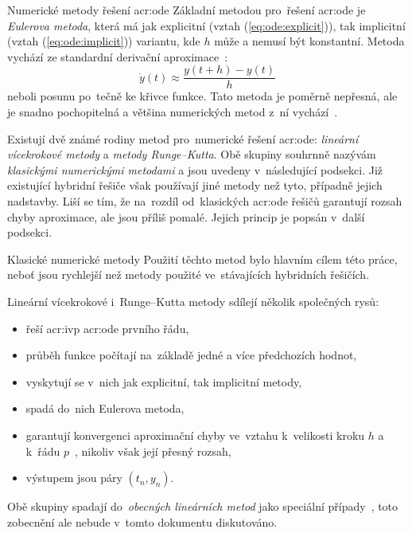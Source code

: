 \documentclass[thesis=M,czech]{FITthesis}[2012/06/26]
\newcommand{\acrlabel}[1]{acr:#1}
\newcommand{\acr}[1]{\acrshort{\acrlabel{#1}}}
\newcommand{\hl}[1]{\textit{#1}}
\newcommand{\name}[1]{\hl{#1}}
\newcommand{\cit}[1]{\cite{#1}}
\newcommand{\rf}[1]{\ref{#1}}
\newcommand{\rfeq}[1]{(\rf{eq:#1})}
\newcommand{\der}[1]{\ensuremath{\dot{#1}}}
\begin{document}
\begin{section}{Numerické metody řešení \acr{ode}}
Základní metodou pro~řešení \acr{ode}
je \name{Eulerova metoda},
která má jak explicitní
(vztah \rfeq{ode:explicit}),
tak implicitní
(vztah \rfeq{ode:implicit})
variantu,
kde $h$ může a nemusí být konstantní.
Metoda vychází ze standardní derivační aproximace~\cit{ode-nsolve-book}:
\begin{equation}\label{eq:der:apx}
   \der{y}(t) \approx \frac{y(t+h) - y(t)}{h}
\end{equation}
neboli posunu po~tečně ke křivce funkce.
Tato metoda je poměrně nepřesná,
ale je snadno pochopitelná
a většina numerických metod z~ní vychází~\cit{ode-nsolve-intro}.

Existují dvě známé rodiny metod pro~numerické řešení \acr{ode}:
\name{lineární vícekrokové metody}
a \name{metody Runge--Kutta}.
Obě skupiny souhrnně nazývám
\name{klasickými numerickými metodami}
a jsou uvedeny v~následující podsekci.
Již existující hybridní řešiče
však používají jiné metody než tyto,
případně jejich nadstavby.
Liší se tím,
že na~rozdíl od~klasických \acr{ode} řešičů
garantují rozsah chyby aproximace, ale jsou příliš pomalé.
Jejich princip je popsán v~další podsekci.


\begin{subsection}{Klasické numerické metody}\label{ss:search:ode:classic}
Použití těchto metod bylo hlavním cílem této práce,
neboť jsou rychlejší než metody použité ve~stávajících hybridních řešičích.

Lineární vícekrokové i~Runge--Kutta metody sdílejí několik společných rysů:
\begin{itemize}
\item řeší \acr{ivp} \acr{ode} prvního řádu,
\item průběh funkce počítají na~základě jedné a více předchozích hodnot,
\item vyskytují se v~nich jak explicitní, tak implicitní metody,
\item spadá do~nich Eulerova metoda,
\item garantují konvergenci aproximační chyby
   ve~vztahu k~velikosti kroku $h$ a k~řádu $p$~\cit{ode-nsolve-book},
   nikoliv však její přesný rozsah,
\item výstupem jsou páry ${(t_n, y_n)}$.
\end{itemize}

Obě skupiny spadají do~\name{obecných lineárních metod}
jako speciální případy~\cit{ode-nsolve-intro},
toto zobecnění ale nebude v~tomto dokumentu diskutováno.


\end{subsection}
\end{section}
\end{document}
